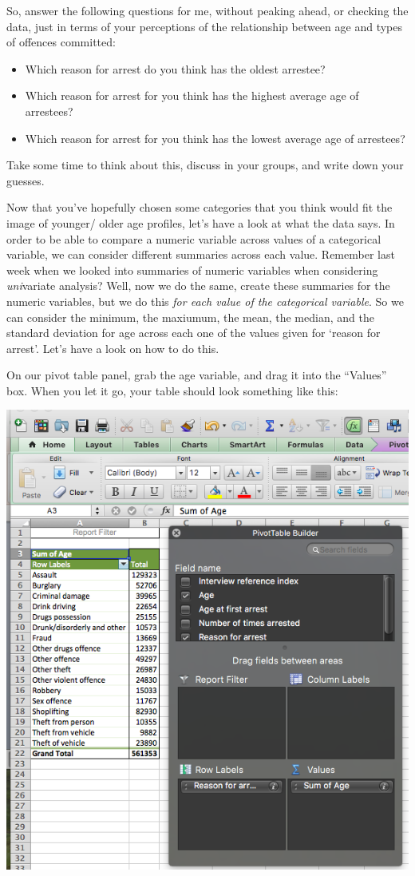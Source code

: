 \documentclass[
]{book}
\providecommand{\tightlist}{%
  \setlength{\itemsep}{0pt}\setlength{\parskip}{0pt}}
\begin{document}
So, answer the following questions for me, without peaking ahead, or checking the data, just in terms of your perceptions of the relationship between age and types of offences committed:

\begin{itemize}
\tightlist
\item
  Which reason for arrest do you think has the oldest arrestee?
\item
  Which reason for arrest for you think has the highest average age of arrestees?
\item
  Which reason for arrest for you think has the lowest average age of arrestees?
\end{itemize}

Take some time to think about this, discuss in your groups, and write down your guesses.

Now that you've hopefully chosen some categories that you think would fit the image of younger/ older age profiles, let's have a look at what the data says. In order to be able to compare a numeric variable across values of a categorical variable, we can consider different summaries across each value. Remember last week when we looked into summaries of numeric variables when considering \emph{uni}variate analysis? Well, now we do the same, create these summaries for the numeric variables, but we do this \emph{for each value of the categorical variable}. So we can consider the minimum, the maxiumum, the mean, the median, and the standard deviation for age across each one of the values given for `reason for arrest'. Let's have a look on how to do this.

On our pivot table panel, grab the age variable, and drag it into the ``Values'' box. When you let it go, your table should look something like this:

\includegraphics{imgs/age_to_value.png}
\end{document}
